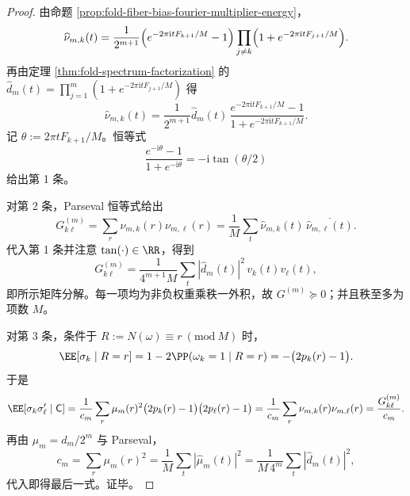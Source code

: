 \begin{proof}
由命题 \ref{prop:fold-fiber-bias-fourier-multiplier-energy}，
\[
\widehat{\nu}_{m,k}(t)
=\frac{1}{2^{m+1}}
\Bigl(e^{-2\pi \mathrm{i}tF_{k+1}/M}-1\Bigr)
\prod_{j\ne k}\Bigl(1+e^{-2\pi \mathrm{i}tF_{j+1}/M}\Bigr).
\]
再由定理 \ref{thm:fold-spectrum-factorization} 的
\(
\widehat d_m(t)=\prod_{j=1}^{m}(1+e^{-2\pi \mathrm{i}tF_{j+1}/M})
\)
得
\[
\widehat{\nu}_{m,k}(t)
=\frac{1}{2^{m+1}}\widehat d_m(t)\,
\frac{e^{-2\pi \mathrm{i}tF_{k+1}/M}-1}{1+e^{-2\pi \mathrm{i}tF_{k+1}/M}}.
\]
记 \(\theta:=2\pi tF_{k+1}/M\)。恒等式
\[
\frac{e^{-\mathrm{i}\theta}-1}{1+e^{-\mathrm{i}\theta}}
=-\mathrm{i}\tan(\theta/2)
\]
给出第 1 条。
\par
对第 2 条，Parseval 恒等式给出
\[
G_{k\ell}^{(m)}
=\sum_r \nu_{m,k}(r)\nu_{m,\ell}(r)
=\frac1M\sum_t \widehat{\nu}_{m,k}(t)\,\overline{\widehat{\nu}_{m,\ell}(t)}.
\]
代入第 1 条并注意 \(\tan(\cdot)\in\RR\)，得到
\[
G_{k\ell}^{(m)}
=\frac{1}{4^{m+1}M}\sum_t |\widehat d_m(t)|^2\,v_k(t)v_\ell(t),
\]
即所示矩阵分解。每一项均为非负权重乘秩一外积，故 \(G^{(m)}\succeq 0\)；并且秩至多为项数 \(M\)。
\par
对第 3 条，条件于 \(R:=N(\omega)\equiv r\ (\mathrm{mod}\ M)\) 时，
\[
\EE[\sigma_k\mid R=r]
=1-2\PP(\omega_k=1\mid R=r)
=-\bigl(2p_k(r)-1\bigr).
\]
于是
\[
\EE[\sigma_k\sigma'_\ell\mid \mathsf C]
=\frac{1}{c_m}\sum_r \mu_m(r)^2\bigl(2p_k(r)-1\bigr)\bigl(2p_\ell(r)-1\bigr)
=\frac{1}{c_m}\sum_r \nu_{m,k}(r)\nu_{m,\ell}(r)
=\frac{G_{k\ell}^{(m)}}{c_m}.
\]
再由 \(\mu_m=d_m/2^m\) 与 Parseval，
\[
c_m=\sum_r\mu_m(r)^2=\frac1M\sum_t|\widehat\mu_m(t)|^2
=\frac{1}{M\,4^m}\sum_t|\widehat d_m(t)|^2,
\]
代入即得最后一式。证毕。
\end{proof}

